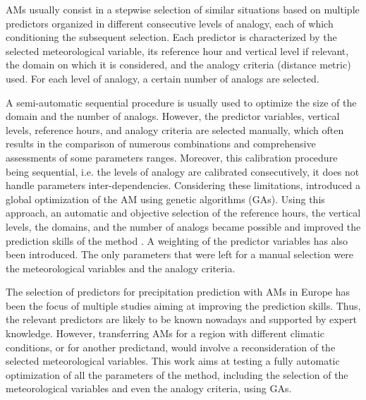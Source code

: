 \documentclass[draft]{agujournal2019}
\begin{document}
AMs usually consist in a stepwise selection of similar situations based on multiple predictors organized in different consecutive levels of analogy, each of which conditioning the subsequent selection. Each predictor is characterized by the selected meteorological variable, its reference hour and vertical level if relevant, the domain on which it is considered, and the analogy criteria (distance metric) used. For each level of analogy, a certain number of analogs are selected.

A semi-automatic sequential procedure \cite{Bontron2004, Radanovics2013, BenDaoud2016} is usually used to optimize the size of the domain and the number of analogs. However, the predictor variables, vertical levels, reference hours, and analogy criteria are selected manually, which often results in the comparison of numerous combinations and comprehensive assessments of some parameters ranges. Moreover, this calibration procedure being sequential, i.e. the levels of analogy are calibrated consecutively, it does not handle parameters inter-dependencies. Considering these limitations,  introduced a global optimization of the AM using genetic algorithms (GAs). Using this approach, an automatic and objective selection of the reference hours, the vertical levels, the domains, and the number of analogs became possible and improved the prediction skills of the method \cite{Horton2018a}. A weighting of the predictor variables has also been introduced. The only parameters that were left for a manual selection were the meteorological variables and the analogy criteria.

The selection of predictors for precipitation prediction with AMs in Europe has been the focus of multiple studies aiming at improving the prediction skills. Thus, the relevant predictors are likely to be known nowadays and supported by expert knowledge. However, transferring AMs for a region with different climatic conditions, or for another predictand, would involve a reconsideration of the selected meteorological variables. This work aims at testing a fully automatic optimization of all the parameters of the method, including the selection of the meteorological variables and even the analogy criteria, using GAs.
\end{document}
